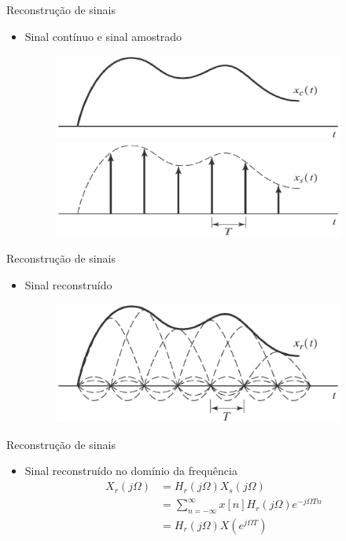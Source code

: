 \documentclass[
size=11pt,
paper=screen,
mode=present,
display=slidesnotes,
style=paintings,
nopagebreaks,
blackslide,
fleqn]{powerdot}
\begin{document}
\begin{slide}{Reconstru\c c\~ao de sinais}
\begin{itemize}
   \item Sinal cont\'inuo e sinal amostrado
   \begin{figure}
      \centering
      \includegraphics[width=0.9\textwidth]{figs/reconstr02a.eps}
      \includegraphics[width=0.9\textwidth]{figs/reconstr02b.eps}
   \end{figure}
\end{itemize}
\end{slide}

\begin{slide}{Reconstru\c c\~ao de sinais}
\begin{itemize}
   \item Sinal reconstru\'ido
   \begin{figure}
      \centering
      \includegraphics[width=0.9\textwidth]{figs/reconstr03.eps}
   \end{figure}
\end{itemize}
\end{slide}

\begin{slide}{Reconstru\c c\~ao de sinais}
\begin{itemize}
   \item Sinal reconstru\'ido no dom\'inio da frequ\^encia 
   \begin{align}
      X_r(j\Omega) &= H_r(j\Omega)X_s(j\Omega)\\
                   &= \sum_{n=-\infty}^{\infty}x[n]H_r(j\Omega)e^{-j\Omega Tn}\\
                   &= H_r(j\Omega)X(e^{j\Omega T})             
   \end{align}
\end{itemize}
\end{slide}
\end{document}
